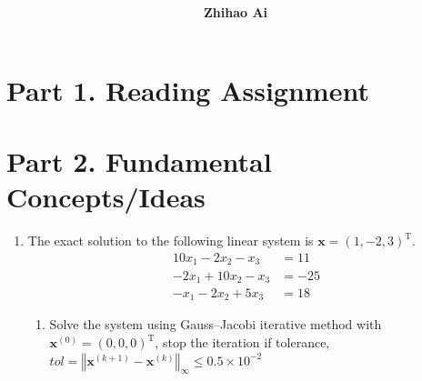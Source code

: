 \documentclass[10pt]{report}
\title{
	\vspace{2in}
	\textmd{\textbf{\hwCourse\\\hwTitle}}\\
	\vspace{0.3in}\large{\textit{\hmwkClassInstructor}}
	\vspace{3in}
}
\author{\textbf{Zhihao Ai}}
\date{}
\newcommand{\norm}[2][\infty] {\left\Vert \mathbf{#2} \right\Vert_#1}
\begin{document}
\maketitle

\section*{Part 1. Reading Assignment}

\section*{Part 2. Fundamental Concepts/Ideas}
\begin{enumerate}
	\item 
	The exact solution to the following linear system is $\mathbf{x} = (1, -2, 3)^\mathrm{T}$.
	\begin{align*}
		10x_1 - 2x_2 - x_3 &= 11\\
		-2x_1 + 10x_2 - x_3 &= -25\\
		-x_1 - 2x_2 + 5x_3 &= 18
	\end{align*}
	\begin{enumerate}
		\item 
		Solve the system using Gauss--Jacobi iterative method with $\mathbf{x}^{(0)} = (0, 0, 0)^\mathrm{T}$, stop the iteration if tolerance, $tol = \norm{x^{(\mathit k + \mathrm 1)} - x^{(\mathit{k})}} \le 0.5\times 10^{-2}$
		

\end{enumerate}
\end{enumerate}
\end{document}

